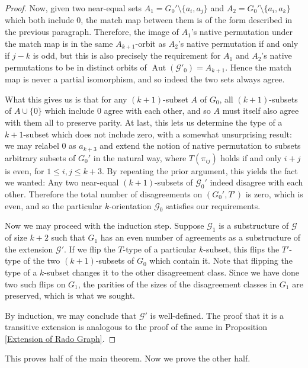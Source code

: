 \documentclass{amsart}
\def\graph{\mathcal{G}}
\newcommand{\set}[1]{\{#1 \}}
\DeclareMathOperator{\Aut}{Aut}
\begin{document}
\begin{proof}
    Now, given two near-equal sets $A_1 = G_0' \setminus \set{a_i, a_j}$ and $A_2 = G_0' \setminus \set{a_i, a_k}$ which both include 0, the match map between them is of the form described in the previous paragraph. Therefore, the image of $A_1$'s native permutation under the match map is in the same $A_{k+1}$-orbit as $A_2$'s native permutation if and only if $j-k$ is odd, but this is also precisely the requirement for $A_1$ and $A_2$'s native permutations to be in distinct orbits of $\Aut(\graph'_0) = A_{k+1}$. Hence the match map is never a partial isomorphism, and so indeed the two sets always agree.

    What this gives us is that for any $(k+1)$-subset $A$ of $G_0$, all $(k+1)$-subsets of $A \cup \set{0}$ which include 0 agree with each other, and so $A$ must itself also agree with them all to preserve parity. At last, this lets us determine the type of a $k+1$-subset which does not include zero, with a somewhat unsurprising result: we may relabel 0 as $a_{k+3}$ and extend the notion of native permutation to subsets arbitrary subsets of $G_0'$ in the natural way, where $T(\pi_{ij})$ holds if and only $i+j$ is even, for $1 \leq i,j\leq k+3$. By repeating the prior argument, this yields the fact we wanted: Any two near-equal $(k+1)$-subsets of $\graph_0'$ indeed disagree with each other. Therefore the total number of disagreements on $(G_0',T')$ is zero, which is even, and so the particular $k$-orientation $\graph_0$ satisfies our requirements.

    Now we may proceed with the induction step. Suppose $\graph_1$ is a substructure of $\graph$ of size $k+2$ such that $G_1$ has an even number of agreements as a substructure of the extension $\graph'$. If we flip the $T$-type of a particular $k$-subset, this flips the $T'$-type of the two $(k+1)$-subsets of $G_0$ which contain it. Note that flipping the type of a $k$-subset changes it to the other disagreement class. Since we have done two such flips on $G_1$, the parities of the sizes of the disagreement classes in $G_1$ are preserved, which is what we sought.

    By induction, we may conclude that $\graph'$ is well-defined. The proof that it is a transitive extension is analogous to the proof of the same in Proposition \ref{Extension of Rado Graph}.
\end{proof}

This proves half of the main theorem. Now we prove the other half.
\end{document}
